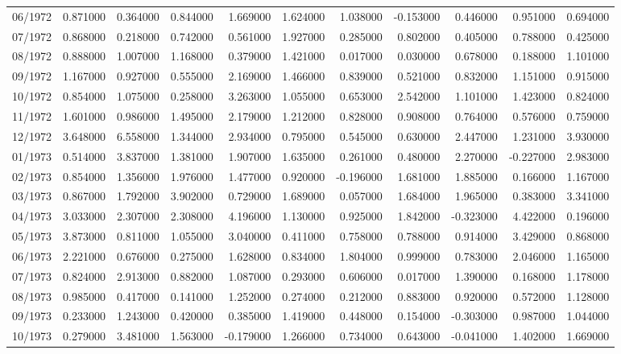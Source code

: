 \begin{tabular}{lrrrrrrrrrr}
06/1972 & 0.871000 & 0.364000 & 0.844000 & 1.669000 & 1.624000 & 1.038000 & -0.153000 & 0.446000 & 0.951000 & 0.694000 \\
07/1972 & 0.868000 & 0.218000 & 0.742000 & 0.561000 & 1.927000 & 0.285000 & 0.802000 & 0.405000 & 0.788000 & 0.425000 \\
08/1972 & 0.888000 & 1.007000 & 1.168000 & 0.379000 & 1.421000 & 0.017000 & 0.030000 & 0.678000 & 0.188000 & 1.101000 \\
09/1972 & 1.167000 & 0.927000 & 0.555000 & 2.169000 & 1.466000 & 0.839000 & 0.521000 & 0.832000 & 1.151000 & 0.915000 \\
10/1972 & 0.854000 & 1.075000 & 0.258000 & 3.263000 & 1.055000 & 0.653000 & 2.542000 & 1.101000 & 1.423000 & 0.824000 \\
11/1972 & 1.601000 & 0.986000 & 1.495000 & 2.179000 & 1.212000 & 0.828000 & 0.908000 & 0.764000 & 0.576000 & 0.759000 \\
12/1972 & 3.648000 & 6.558000 & 1.344000 & 2.934000 & 0.795000 & 0.545000 & 0.630000 & 2.447000 & 1.231000 & 3.930000 \\
01/1973 & 0.514000 & 3.837000 & 1.381000 & 1.907000 & 1.635000 & 0.261000 & 0.480000 & 2.270000 & -0.227000 & 2.983000 \\
02/1973 & 0.854000 & 1.356000 & 1.976000 & 1.477000 & 0.920000 & -0.196000 & 1.681000 & 1.885000 & 0.166000 & 1.167000 \\
03/1973 & 0.867000 & 1.792000 & 3.902000 & 0.729000 & 1.689000 & 0.057000 & 1.684000 & 1.965000 & 0.383000 & 3.341000 \\
04/1973 & 3.033000 & 2.307000 & 2.308000 & 4.196000 & 1.130000 & 0.925000 & 1.842000 & -0.323000 & 4.422000 & 0.196000 \\
05/1973 & 3.873000 & 0.811000 & 1.055000 & 3.040000 & 0.411000 & 0.758000 & 0.788000 & 0.914000 & 3.429000 & 0.868000 \\
06/1973 & 2.221000 & 0.676000 & 0.275000 & 1.628000 & 0.834000 & 1.804000 & 0.999000 & 0.783000 & 2.046000 & 1.165000 \\
07/1973 & 0.824000 & 2.913000 & 0.882000 & 1.087000 & 0.293000 & 0.606000 & 0.017000 & 1.390000 & 0.168000 & 1.178000 \\
08/1973 & 0.985000 & 0.417000 & 0.141000 & 1.252000 & 0.274000 & 0.212000 & 0.883000 & 0.920000 & 0.572000 & 1.128000 \\
09/1973 & 0.233000 & 1.243000 & 0.420000 & 0.385000 & 1.419000 & 0.448000 & 0.154000 & -0.303000 & 0.987000 & 1.044000 \\
10/1973 & 0.279000 & 3.481000 & 1.563000 & -0.179000 & 1.266000 & 0.734000 & 0.643000 & -0.041000 & 1.402000 & 1.669000 \\

\end{tabular}
